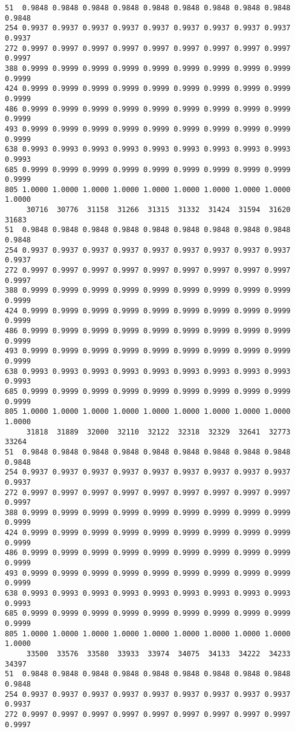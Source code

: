 \documentclass[
]{report}
\begin{document}
\begin{verbatim}
51  0.9848 0.9848 0.9848 0.9848 0.9848 0.9848 0.9848 0.9848 0.9848 0.9848
254 0.9937 0.9937 0.9937 0.9937 0.9937 0.9937 0.9937 0.9937 0.9937 0.9937
272 0.9997 0.9997 0.9997 0.9997 0.9997 0.9997 0.9997 0.9997 0.9997 0.9997
388 0.9999 0.9999 0.9999 0.9999 0.9999 0.9999 0.9999 0.9999 0.9999 0.9999
424 0.9999 0.9999 0.9999 0.9999 0.9999 0.9999 0.9999 0.9999 0.9999 0.9999
486 0.9999 0.9999 0.9999 0.9999 0.9999 0.9999 0.9999 0.9999 0.9999 0.9999
493 0.9999 0.9999 0.9999 0.9999 0.9999 0.9999 0.9999 0.9999 0.9999 0.9999
638 0.9993 0.9993 0.9993 0.9993 0.9993 0.9993 0.9993 0.9993 0.9993 0.9993
685 0.9999 0.9999 0.9999 0.9999 0.9999 0.9999 0.9999 0.9999 0.9999 0.9999
805 1.0000 1.0000 1.0000 1.0000 1.0000 1.0000 1.0000 1.0000 1.0000 1.0000
     30716  30776  31158  31266  31315  31332  31424  31594  31620  31683
51  0.9848 0.9848 0.9848 0.9848 0.9848 0.9848 0.9848 0.9848 0.9848 0.9848
254 0.9937 0.9937 0.9937 0.9937 0.9937 0.9937 0.9937 0.9937 0.9937 0.9937
272 0.9997 0.9997 0.9997 0.9997 0.9997 0.9997 0.9997 0.9997 0.9997 0.9997
388 0.9999 0.9999 0.9999 0.9999 0.9999 0.9999 0.9999 0.9999 0.9999 0.9999
424 0.9999 0.9999 0.9999 0.9999 0.9999 0.9999 0.9999 0.9999 0.9999 0.9999
486 0.9999 0.9999 0.9999 0.9999 0.9999 0.9999 0.9999 0.9999 0.9999 0.9999
493 0.9999 0.9999 0.9999 0.9999 0.9999 0.9999 0.9999 0.9999 0.9999 0.9999
638 0.9993 0.9993 0.9993 0.9993 0.9993 0.9993 0.9993 0.9993 0.9993 0.9993
685 0.9999 0.9999 0.9999 0.9999 0.9999 0.9999 0.9999 0.9999 0.9999 0.9999
805 1.0000 1.0000 1.0000 1.0000 1.0000 1.0000 1.0000 1.0000 1.0000 1.0000
     31818  31889  32000  32110  32122  32318  32329  32641  32773  33264
51  0.9848 0.9848 0.9848 0.9848 0.9848 0.9848 0.9848 0.9848 0.9848 0.9848
254 0.9937 0.9937 0.9937 0.9937 0.9937 0.9937 0.9937 0.9937 0.9937 0.9937
272 0.9997 0.9997 0.9997 0.9997 0.9997 0.9997 0.9997 0.9997 0.9997 0.9997
388 0.9999 0.9999 0.9999 0.9999 0.9999 0.9999 0.9999 0.9999 0.9999 0.9999
424 0.9999 0.9999 0.9999 0.9999 0.9999 0.9999 0.9999 0.9999 0.9999 0.9999
486 0.9999 0.9999 0.9999 0.9999 0.9999 0.9999 0.9999 0.9999 0.9999 0.9999
493 0.9999 0.9999 0.9999 0.9999 0.9999 0.9999 0.9999 0.9999 0.9999 0.9999
638 0.9993 0.9993 0.9993 0.9993 0.9993 0.9993 0.9993 0.9993 0.9993 0.9993
685 0.9999 0.9999 0.9999 0.9999 0.9999 0.9999 0.9999 0.9999 0.9999 0.9999
805 1.0000 1.0000 1.0000 1.0000 1.0000 1.0000 1.0000 1.0000 1.0000 1.0000
     33500  33576  33580  33933  33974  34075  34133  34222  34233  34397
51  0.9848 0.9848 0.9848 0.9848 0.9848 0.9848 0.9848 0.9848 0.9848 0.9848
254 0.9937 0.9937 0.9937 0.9937 0.9937 0.9937 0.9937 0.9937 0.9937 0.9937
272 0.9997 0.9997 0.9997 0.9997 0.9997 0.9997 0.9997 0.9997 0.9997 0.9997

\end{verbatim}
\end{document}
